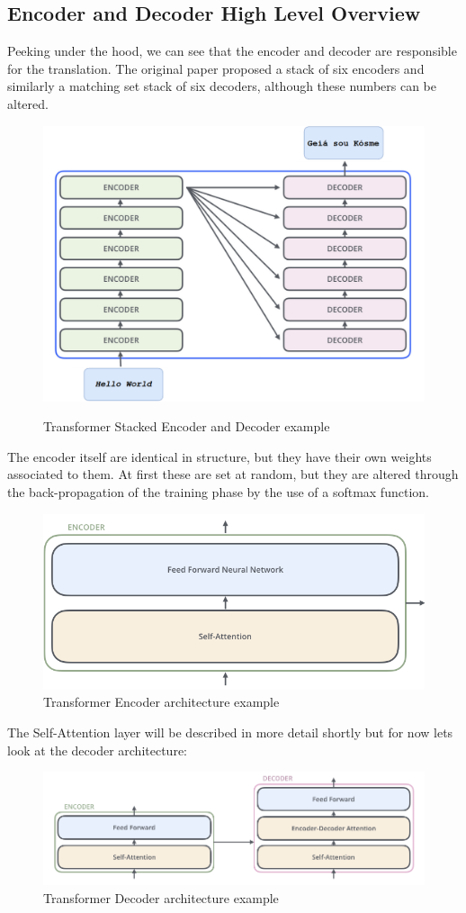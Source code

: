 \subsection{Encoder and Decoder High Level Overview}
Peeking under the hood, we can see that the encoder and decoder are responsible for the translation. The original paper proposed a stack of
six encoders and similarly a matching set stack of six decoders, although these numbers can be altered.
\begin{figure}[H]
	\centering
	\includegraphics[width=0.65\linewidth]{figures/transformer_stacked_encoder_decoder.png}
	\label{fig:transformer_stacked_encoder_decoder}
	\caption{Transformer Stacked Encoder and Decoder example~\autocite{alammarIllustratedTransformer}}
\end{figure}
The encoder itself are identical in structure, but they have their own weights associated to them. At first these are set at random, but they are
altered through the back-propagation of the training phase by the use of a softmax function. %
\begin{figure}[H]
	\centering
	\includegraphics[width=0.6\linewidth]{figures/encoder_architecture.png}
	\caption{Transformer Encoder architecture example~\autocite{alammarIllustratedTransformer}}
	\label{fig:transformer_encoder}
\end{figure}
The Self-Attention layer will be described in more detail shortly but for now lets look at the decoder architecture:
\begin{figure}[H]
	\centering
	\includegraphics[width=0.9\linewidth]{figures/decoder_archi_1.png}
	\caption{Transformer Decoder architecture example~\autocite{alammarIllustratedTransformer}}
	\label{fig:transformer_decoder}
\end{figure}
